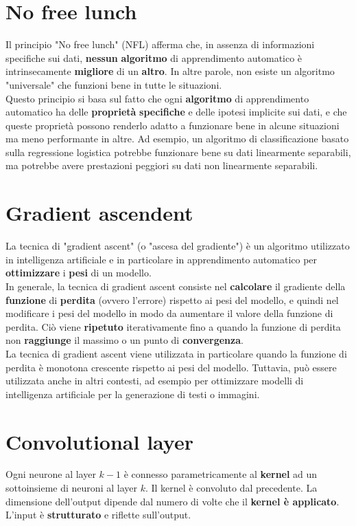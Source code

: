 \documentclass{article}
\begin{document}
\section{No free lunch}
Il principio "No free lunch" (NFL) afferma che, in assenza di informazioni specifiche sui dati, \textbf{nessun} \textbf{algoritmo} di apprendimento automatico è intrinsecamente \textbf{migliore} di un \textbf{altro}. In altre parole, non esiste un algoritmo "universale" che funzioni bene in tutte le situazioni.
\\
Questo principio si basa sul fatto che ogni \textbf{algoritmo} di apprendimento automatico ha delle \textbf{proprietà} \textbf{specifiche} e delle ipotesi implicite sui dati, e che queste proprietà possono renderlo adatto a funzionare bene in alcune situazioni ma meno performante in altre. Ad esempio, un algoritmo di classificazione basato sulla regressione logistica potrebbe funzionare bene su dati linearmente separabili, ma potrebbe avere prestazioni peggiori su dati non linearmente separabili.


\section{Gradient ascendent}
La tecnica di "gradient ascent" (o "ascesa del gradiente") è un algoritmo utilizzato in intelligenza artificiale e in particolare in apprendimento automatico per \textbf{ottimizzare} i \textbf{pesi} di un modello.
\\
In generale, la tecnica di gradient ascent consiste nel \textbf{calcolare} il gradiente della \textbf{funzione} di \textbf{perdita} (ovvero l'errore) rispetto ai pesi del modello, e quindi nel modificare i pesi del modello in modo da aumentare il valore della funzione di perdita. Ciò viene \textbf{ripetuto} iterativamente fino a quando la funzione di perdita non \textbf{raggiunge} il massimo o un punto di \textbf{convergenza}.
\\
La tecnica di gradient ascent viene utilizzata in particolare quando la funzione di perdita è monotona crescente rispetto ai pesi del modello. Tuttavia, può essere utilizzata anche in altri contesti, ad esempio per ottimizzare modelli di intelligenza artificiale per la generazione di testi o immagini.

\section{Convolutional layer}
Ogni neurone al layer $k-1$ è connesso parametricamente al \textbf{kernel} ad un sottoinsieme di neuroni al layer $k$. Il kernel è convoluto dal precedente. La dimensione dell'output dipende dal numero di volte che il \textbf{kernel è applicato}. L'input è \textbf{strutturato} e riflette sull'output.
\end{document}
